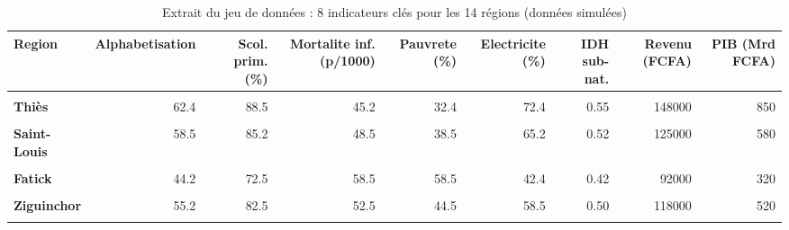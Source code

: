 \documentclass[
]{article}
\begin{document}

\begingroup\fontsize{8.5}{10.5}\selectfont

\begin{longtable}[t]{>{}lrrrrrrrr}
\caption{\label{tab:annexe-data}Extrait du jeu de données : 8 indicateurs clés pour les 14 régions (données simulées)}\\
\toprule
Region & Alphabetisation & Scol. prim. (\%) & Mortalite inf. (p/1000) & Pauvrete (\%) & Electricite (\%) & IDH sub-nat. & Revenu (FCFA) & PIB (Mrd FCFA)\\
\midrule
\textcolor[HTML]{B92346}{\textbf{\cellcolor{gray!10}{Dakar}}} & \cellcolor{gray!10}{85.2} & \cellcolor{gray!10}{98.1} & \cellcolor{gray!10}{28.5} & \cellcolor{gray!10}{17.1} & \cellcolor{gray!10}{98.5} & \cellcolor{gray!10}{0.72} & \cellcolor{gray!10}{285000} & \cellcolor{gray!10}{4250}\\
\textcolor[HTML]{B92346}{\textbf{Thiès}} & 62.4 & 88.5 & 45.2 & 32.4 & 72.4 & 0.55 & 148000 & 850\\
\textcolor[HTML]{B92346}{\textbf{\cellcolor{gray!10}{Diourbel}}} & \cellcolor{gray!10}{41.2} & \cellcolor{gray!10}{74.2} & \cellcolor{gray!10}{62.4} & \cellcolor{gray!10}{54.2} & \cellcolor{gray!10}{48.2} & \cellcolor{gray!10}{0.41} & \cellcolor{gray!10}{98000} & \cellcolor{gray!10}{420}\\
\textcolor[HTML]{B92346}{\textbf{Saint-Louis}} & 58.5 & 85.2 & 48.5 & 38.5 & 65.2 & 0.52 & 125000 & 580\\
\textcolor[HTML]{B92346}{\textbf{\cellcolor{gray!10}{Louga}}} & \cellcolor{gray!10}{38.5} & \cellcolor{gray!10}{68.4} & \cellcolor{gray!10}{68.5} & \cellcolor{gray!10}{62.4} & \cellcolor{gray!10}{38.5} & \cellcolor{gray!10}{0.38} & \cellcolor{gray!10}{82000} & \cellcolor{gray!10}{285}\\
\addlinespace
\textcolor[HTML]{B92346}{\textbf{Fatick}} & 44.2 & 72.5 & 58.5 & 58.5 & 42.4 & 0.42 & 92000 & 320\\
\textcolor[HTML]{B92346}{\textbf{\cellcolor{gray!10}{Kaolack}}} & \cellcolor{gray!10}{52.4} & \cellcolor{gray!10}{80.2} & \cellcolor{gray!10}{52.4} & \cellcolor{gray!10}{48.2} & \cellcolor{gray!10}{55.4} & \cellcolor{gray!10}{0.48} & \cellcolor{gray!10}{112000} & \cellcolor{gray!10}{485}\\
\textcolor[HTML]{B92346}{\textbf{Ziguinchor}} & 55.2 & 82.5 & 52.5 & 44.5 & 58.5 & 0.50 & 118000 & 520\\
\textcolor[HTML]{B92346}{\textbf{\cellcolor{gray!10}{Kolda}}} & \cellcolor{gray!10}{32.4} & \cellcolor{gray!10}{62.4} & \cellcolor{gray!10}{75.4} & \cellcolor{gray!10}{72.4} & \cellcolor{gray!10}{28.5} & \cellcolor{gray!10}{0.32} & \cellcolor{gray!10}{68000} & \cellcolor{gray!10}{198}\\

\end{longtable}
\end{document}

